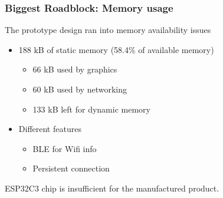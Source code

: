 \documentclass{beamer}
\begin{document}
\begin{frame}
  \frametitle{Biggest Roadblock: Memory usage}

  The prototype design ran into memory availability issues
  \begin{itemize}
    \item 188 kB of static memory (58.4\% of available memory)
    \begin{itemize}
      \item 66 kB used by graphics
      \item 60 kB used by networking
      \item 133 kB left for dynamic memory
    \end{itemize}
    \item Different features
    \begin{itemize}
      \item BLE for Wifi info
      \item Persistent connection
    \end{itemize}
  \end{itemize}
  ESP32C3 chip is insufficient for the manufactured product.


\end{frame}
\end{document}
